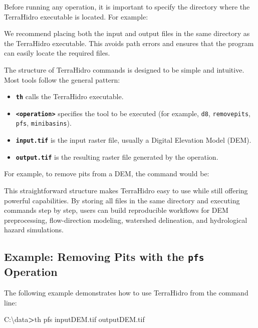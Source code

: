 \documentclass[
]{book}
\newenvironment{Shaded}{\begin{snugshade}}{\end{snugshade}}
\newcommand{\ExtensionTok}[1]{#1}
\newcommand{\NormalTok}[1]{#1}
\newcommand{\OperatorTok}[1]{\textcolor[rgb]{0.81,0.36,0.00}{\textbf{#1}}}
\providecommand{\tightlist}{%
  \setlength{\itemsep}{0pt}\setlength{\parskip}{0pt}}
\theoremstyle{definition}
\theoremstyle{definition}
\theoremstyle{definition}
\theoremstyle{definition}
\theoremstyle{remark}
\begin{document}
Before running any operation, it is important to specify the directory where the TerraHidro executable is located. For example:

We recommend placing both the input and output files in the same directory as the TerraHidro executable. This avoids path errors and ensures that the program can easily locate the required files.

The structure of TerraHidro commands is designed to be simple and intuitive. Most tools follow the general pattern:

\begin{itemize}
\tightlist
\item
  \textbf{\texttt{th}} calls the TerraHidro executable.\\
\item
  \textbf{\texttt{\textless{}operation\textgreater{}}} specifies the tool to be executed (for example, \texttt{d8}, \texttt{removepits}, \texttt{pfs}, \texttt{minibasins}).\\
\item
  \textbf{\texttt{input.tif}} is the input raster file, usually a Digital Elevation Model (DEM).\\
\item
  \textbf{\texttt{output.tif}} is the resulting raster file generated by the operation.
\end{itemize}

For example, to remove pits from a DEM, the command would be:

This straightforward structure makes TerraHidro easy to use while still offering powerful capabilities. By storing all files in the same directory and executing commands step by step, users can build reproducible workflows for DEM preprocessing, flow-direction modeling, watershed delineation, and hydrological hazard simulations.

\subsection*{\texorpdfstring{Example: Removing Pits with the \texttt{pfs} Operation}{Example: Removing Pits with the pfs Operation}}\label{example-removing-pits-with-the-pfs-operation}

The following example demonstrates how to use TerraHidro from the command line:

\begin{Shaded}
\begin{Highlighting}[]
\ExtensionTok{C:\textbackslash{}data}\OperatorTok{\textgreater{}}\NormalTok{th pfs inputDEM.tif outputDEM.tif}
\end{Highlighting}
\end{Shaded}
\end{document}
